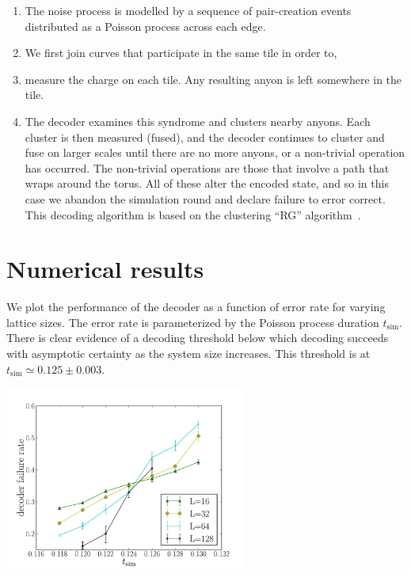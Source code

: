 \documentclass[aps, pra, a4paper, 11pt, nofootinbib, superscriptaddress, tightenlines, 
notitlepage, longbibliography]{revtex4}
\begin{document}
		\begin{enumerate}
			\item The noise process is modelled by a sequence of pair-creation events distributed as a Poisson process across each edge.
			\item We first join curves that participate in the same tile in order to,
			\item measure the charge on each tile. Any resulting anyon is left somewhere in the tile.
			\item The decoder examines this syndrome and clusters nearby anyons. Each cluster is then measured (fused), and the decoder continues to cluster and fuse on larger scales until there are no more anyons, or a non-trivial operation has occurred. The non-trivial operations are those that involve a path that wraps around the torus. All of these alter the encoded state, and so in this case we abandon the simulation round and declare failure to error correct. This decoding algorithm is based on the clustering ``RG'' algorithm~\cite{Bravyi2011}.
		\end{enumerate}


\section{Numerical results}

	We plot the performance of the decoder as a function of error rate for varying lattice sizes. The error rate is parameterized by the Poisson process duration $t_{\mathrm{sim}}$. There is clear evidence of a decoding threshold below
which decoding succeeds with asymptotic certainty as the system size increases. This threshold is at $t_{\mathrm{sim}}\simeq 0.125 \pm 0.003.$

	\begin{center}\includegraphics[width=0.6\textwidth]{anyons-kyle.pdf}\end{center}
\end{document}
